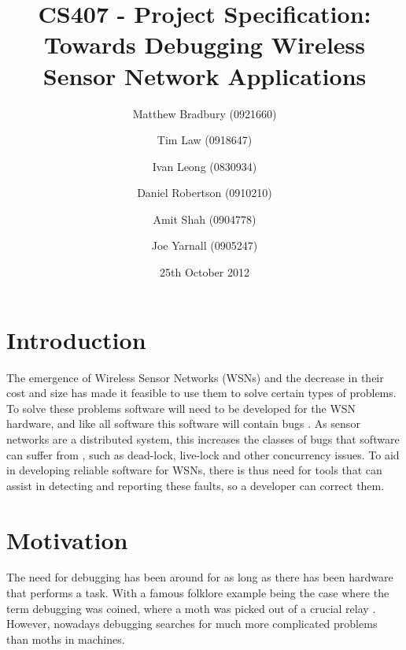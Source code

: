 \documentclass[a4paper]{article}
\title{CS407 - Project Specification:\\
Towards Debugging Wireless Sensor Network Applications}
\date{25th October 2012}
\author{
	Matthew Bradbury (0921660) \and
	Tim Law (0918647) \and
	Ivan Leong (0830934) \and
	Daniel Robertson (0910210) \and
	Amit Shah (0904778) \and
	Joe Yarnall (0905247)
}
\begin{document}
\maketitle

\pagestyle{empty}
\thispagestyle{empty}

\newpage

\pagestyle{plain}
\setcounter{page}{1}

\tableofcontents
\clearpage


\section{Introduction}

The emergence of Wireless Sensor Networks (WSNs) and the decrease in their cost and size has made it feasible to use them to solve certain types of problems. To solve these problems software will need to be developed for the WSN hardware, and like all software this software will contain bugs \cite{5010224}. As sensor networks are a distributed system, this increases the classes of bugs that software can suffer from \cite{5010224}, such as dead-lock, live-lock and other concurrency issues. To aid in developing reliable software for WSNs, there is thus need for tools that can assist in detecting and reporting these faults, so a developer can correct them.

\section{Motivation}

The need for debugging has been around for as long as there has been hardware that performs a task. With a famous folklore example being the case where the term debugging was coined, where a moth was picked out of a crucial relay \cite{shapiro1987etymology}. However, nowadays debugging searches for much more complicated problems than moths in machines.
\end{document}
